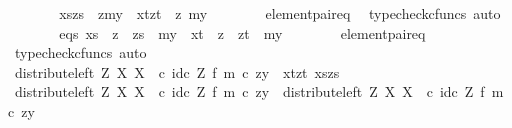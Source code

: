 \begin{isabellebody}
\ \ \ \ \isamarkupfalse%
\ \isamarkupfalse%
\ {\isachardoublequoteopen}{\isasymlangle}xs{\isacharcomma}{\kern0pt}zs{\isasymrangle}\ {\isacharequal}{\kern0pt}\ {\isasymlangle}z{\isacharcomma}{\kern0pt}my{}{\isasymrangle}\ {\isasymand}\ {\isasymlangle}xt{\isacharcomma}{\kern0pt}zt{\isasymrangle}\ {\isacharequal}{\kern0pt}\ {\isasymlangle}z{\isacharcomma}{\kern0pt}\ my{}{\isasymrangle}{\isachardoublequoteclose}\isanewline
\ \ \ \ \ \ \isamarkupfalse%
\ element{\isacharunderscore}{\kern0pt}pair{\isacharunderscore}{\kern0pt}eq\ \isamarkupfalse%
\ {\isacharparenleft}{\kern0pt}typecheck{\isacharunderscore}{\kern0pt}cfuncs{\isacharcomma}{\kern0pt}\ auto{\isacharparenright}{\kern0pt}\isanewline
\ \ \ \ \isamarkupfalse%
\ \isamarkupfalse%
\ eqs{\isacharcolon}{\kern0pt}\ {\isachardoublequoteopen}xs\ {\isacharequal}{\kern0pt}\ z\ {\isasymand}\ zs\ {\isacharequal}{\kern0pt}\ my{}\ {\isasymand}\ xt\ {\isacharequal}{\kern0pt}\ z\ {\isasymand}\ zt\ {\isacharequal}{\kern0pt}\ my{}{\isachardoublequoteclose}\isanewline
\ \ \ \ \ \ \isamarkupfalse%
\ element{\isacharunderscore}{\kern0pt}pair{\isacharunderscore}{\kern0pt}eq\ \isamarkupfalse%
\ {\isacharparenleft}{\kern0pt}typecheck{\isacharunderscore}{\kern0pt}cfuncs{\isacharcomma}{\kern0pt}\ auto{\isacharparenright}{\kern0pt}\isanewline
\isanewline
\ \ \ \ \isamarkupfalse%
\ {\isachardoublequoteopen}{\isacharparenleft}{\kern0pt}distribute{\isacharunderscore}{\kern0pt}left\ Z\ X\ X\ \ {\isasymcirc}\isactrlsub c\ {\isacharparenleft}{\kern0pt}id\isactrlsub c\ Z\ {\isasymtimes}\isactrlsub f\ m{\isacharparenright}{\kern0pt}{\isacharparenright}{\kern0pt}\ {\isasymcirc}\isactrlsub c\ {\isasymlangle}z{\isacharcomma}{\kern0pt}y{\isacharprime}{\kern0pt}{\isasymrangle}\ {\isacharequal}{\kern0pt}\ {\isasymlangle}{\isasymlangle}xt{\isacharcomma}{\kern0pt}zt{\isasymrangle}{\isacharcomma}{\kern0pt}\ {\isasymlangle}xs{\isacharcomma}{\kern0pt}zs{\isasymrangle}{\isasymrangle}{\isachardoublequoteclose}\isanewline
\ \ \ \ \isamarkupfalse%
\ {\isacharminus}{\kern0pt}\isanewline
\ \ \ \ \ \ \isamarkupfalse%
\ {\isachardoublequoteopen}{\isacharparenleft}{\kern0pt}distribute{\isacharunderscore}{\kern0pt}left\ Z\ X\ X\ \ {\isasymcirc}\isactrlsub c\ {\isacharparenleft}{\kern0pt}id\isactrlsub c\ Z\ {\isasymtimes}\isactrlsub f\ m{\isacharparenright}{\kern0pt}{\isacharparenright}{\kern0pt}\ {\isasymcirc}\isactrlsub c\ {\isasymlangle}z{\isacharcomma}{\kern0pt}y{\isacharprime}{\kern0pt}{\isasymrangle}\ {\isacharequal}{\kern0pt}\ distribute{\isacharunderscore}{\kern0pt}left\ Z\ X\ X\ \ {\isasymcirc}\isactrlsub c\ {\isacharparenleft}{\kern0pt}id\isactrlsub c\ Z\ {\isasymtimes}\isactrlsub f\ m{\isacharparenright}{\kern0pt}\ {\isasymcirc}\isactrlsub c\ {\isasymlangle}z{\isacharcomma}{\kern0pt}y{\isacharprime}{\kern0pt}{\isasymrangle}{\isachardoublequoteclose}\isanewline

\end{isabellebody}
